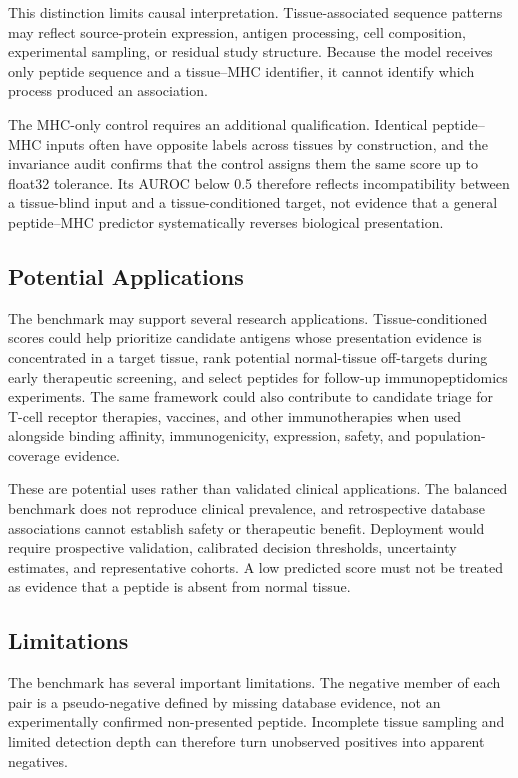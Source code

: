 This distinction limits causal interpretation. Tissue-associated sequence patterns may reflect source-protein expression, antigen processing, cell composition, experimental sampling, or residual study structure. Because the model receives only peptide sequence and a tissue--MHC identifier, it cannot identify which process produced an association.

The MHC-only control requires an additional qualification. Identical peptide--MHC inputs often have opposite labels across tissues by construction, and the invariance audit confirms that the control assigns them the same score up to float32 tolerance. Its AUROC below 0.5 therefore reflects incompatibility between a tissue-blind input and a tissue-conditioned target, not evidence that a general peptide--MHC predictor systematically reverses biological presentation.

\subsection{Potential Applications}

The benchmark may support several research applications. Tissue-conditioned scores could help prioritize candidate antigens whose presentation evidence is concentrated in a target tissue, rank potential normal-tissue off-targets during early therapeutic screening, and select peptides for follow-up immunopeptidomics experiments. The same framework could also contribute to candidate triage for T-cell receptor therapies, vaccines, and other immunotherapies when used alongside binding affinity, immunogenicity, expression, safety, and population-coverage evidence.

These are potential uses rather than validated clinical applications. The balanced benchmark does not reproduce clinical prevalence, and retrospective database associations cannot establish safety or therapeutic benefit. Deployment would require prospective validation, calibrated decision thresholds, uncertainty estimates, and representative cohorts. A low predicted score must not be treated as evidence that a peptide is absent from normal tissue.

\subsection{Limitations}

The benchmark has several important limitations. The negative member of each pair is a pseudo-negative defined by missing database evidence, not an experimentally confirmed non-presented peptide. Incomplete tissue sampling and limited detection depth can therefore turn unobserved positives into apparent negatives.

